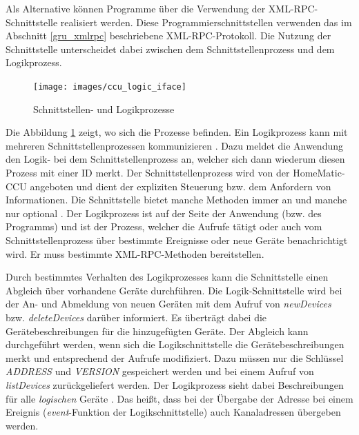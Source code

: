 Als Alternative können Programme über die Verwendung der XML-RPC-Schnittstelle \cite[Seite 4]{homematic_xmlrpc}
realisiert werden.
Diese Programmierschnittstellen verwenden das im Abschnitt \ref{gru_xmlrpc} beschriebene XML-RPC-Protokoll.
Die Nutzung der Schnittstelle unterscheidet dabei zwischen dem Schnittstellenprozess und dem Logikprozess.


\begin{figure}[h!]
\texttt{[image: images/ccu\_logic\_iface]}
\caption{Schnittstellen- und Logikprozesse}
\label{abb_ccu_logic_iface}
\end{figure}
Die Abbildung \ref{abb_ccu_logic_iface} zeigt, wo sich die Prozesse befinden.
Ein Logikprozess kann mit mehreren Schnittstellenprozessen kommunizieren \cite[Seite 3]{homematic_xmlrpc}.
Dazu meldet die Anwendung den Logik- bei dem Schnittstellenprozess an, welcher sich dann wiederum diesen
Prozess mit einer ID merkt.
Der Schnittstellenprozess wird von der HomeMatic-CCU angeboten und dient der expliziten Steuerung
bzw. dem Anfordern von Informationen.
Die Schnittstelle bietet manche Methoden immer an und manche nur optional \cite[Seite 14]{homematic_xmlrpc}.
Der Logikprozess ist auf der Seite der Anwendung (bzw. des Programms) und ist der Prozess, welcher die
Aufrufe tätigt oder auch vom Schnittstellenprozess über bestimmte Ereignisse oder neue Geräte
benachrichtigt wird.
Er muss bestimmte XML-RPC-Methoden \cite[Seite 22]{homematic_xmlrpc} bereitstellen.

Durch bestimmtes Verhalten des Logikprozesses kann die Schnittstelle einen Abgleich über vorhandene
Geräte durchführen.
Die Logik-Schnittstelle wird bei der An- und Abmeldung von neuen Geräten mit dem Aufruf von \emph{newDevices}
bzw. \emph{deleteDevices} \cite{homematic_xmlrpc} darüber informiert.
Es überträgt dabei die Gerätebeschreibungen für die hinzugefügten Geräte.
Der Abgleich kann durchgeführt werden, wenn sich die Logikschnittstelle die Gerätebeschreibungen
merkt \cite[Seite 22]{homematic_xmlrpc} und entsprechend der Aufrufe modifiziert.
Dazu müssen nur die Schlüssel \emph{ADDRESS} und \emph{VERSION} gespeichert werden und bei einem
Aufruf von \emph{listDevices} zurückgeliefert werden.
Der Logikprozess sieht dabei Beschreibungen für alle \emph{logischen} Geräte \cite[Seite 3]{homematic_xmlrpc}.
Das heißt, dass  bei der Übergabe der Adresse bei einem Ereignis (\emph{event}-Funktion der
Logikschnittstelle) auch Kanaladressen übergeben werden.

